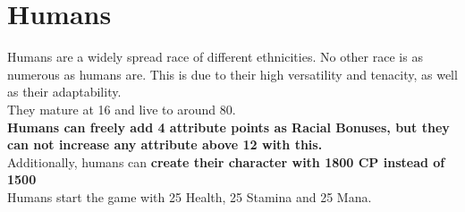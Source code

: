 \section{Humans}\label{race:human}
Humans are a widely spread race of different ethnicities.
No other race is as numerous as humans are.
This is due to their high versatility and tenacity, as well as their adaptability.\\
They mature at 16 and live to around 80.\\
\textbf{Humans can freely add 4 attribute points as Racial Bonuses, but they can not increase any attribute above 12 with this.}\\
Additionally, humans can \textbf{create their character with 1800 CP instead of 1500}\\
Humans start the game with 25 Health, 25 Stamina and 25 Mana.